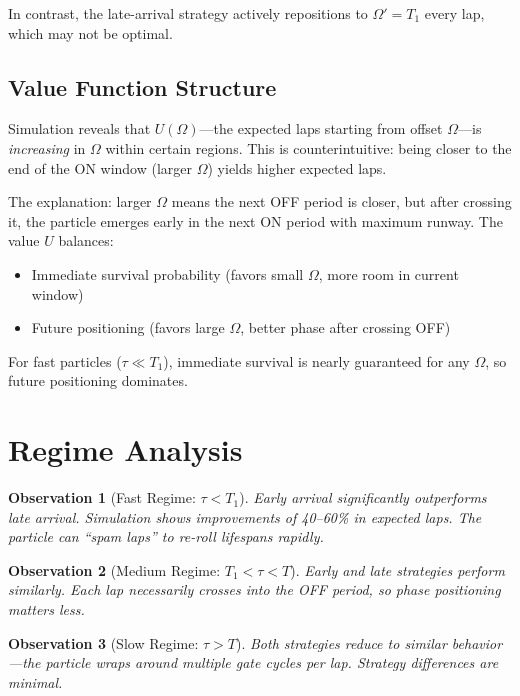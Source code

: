 \documentclass{article}
\newtheorem{observation}{Observation}
\begin{document}
In contrast, the late-arrival strategy actively repositions to $\Omega' = T_1$ every lap, which may not be optimal.

\subsection{Value Function Structure}

Simulation reveals that $U(\Omega)$---the expected laps starting from offset $\Omega$---is \emph{increasing} in $\Omega$ within certain regions. This is counterintuitive: being closer to the end of the ON window (larger $\Omega$) yields higher expected laps.

The explanation: larger $\Omega$ means the next OFF period is closer, but after crossing it, the particle emerges early in the next ON period with maximum runway. The value $U$ balances:
\begin{itemize}
    \item Immediate survival probability (favors small $\Omega$, more room in current window)
    \item Future positioning (favors large $\Omega$, better phase after crossing OFF)
\end{itemize}

For fast particles ($\tau \ll T_1$), immediate survival is nearly guaranteed for any $\Omega$, so future positioning dominates.

\section{Regime Analysis}

\begin{observation}[Fast Regime: $\tau < T_1$]
Early arrival significantly outperforms late arrival. Simulation shows improvements of 40--60\% in expected laps. The particle can ``spam laps'' to re-roll lifespans rapidly.
\end{observation}

\begin{observation}[Medium Regime: $T_1 < \tau < T$]
Early and late strategies perform similarly. Each lap necessarily crosses into the OFF period, so phase positioning matters less.
\end{observation}

\begin{observation}[Slow Regime: $\tau > T$]
Both strategies reduce to similar behavior---the particle wraps around multiple gate cycles per lap. Strategy differences are minimal.
\end{observation}
\end{document}
